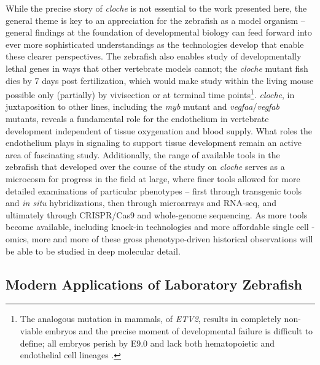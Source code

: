 While the precise story of \textit{cloche} is not essential to the work presented here, the general theme is key to an appreciation for the zebrafish as a model organism -- general findings at the foundation of developmental biology can feed forward into ever more sophisticated understandings as the technologies develop that enable these clearer perspectives. The zebrafish also enables study of developmentally lethal genes in ways that other vertebrate models cannot; the \textit{cloche} mutant fish dies by 7 days post fertilization, which would make study within the living mouse possible only (partially) by vivisection or at terminal time points\footnote{The analogous mutation in mammals, of \textit{ETV2}, results in completely non\hyp{}viable embryos and the precise moment of developmental failure is difficult to define; all embryos perish by E9.0 and lack both hematopoietic and endothelial cell lineages \citep{Garry2016}.}. \textit{cloche}, in juxtaposition to other lines, including the \textit{myb} mutant and \textit{vegfaa}/\textit{vegfab} mutants, reveals a fundamental role for the endothelium in vertebrate development independent of tissue oxygenation and blood supply. What roles the endothelium plays in signaling to support tissue development remain an active area of fascinating study. Additionally, the range of available tools in the zebrafish that developed over the course of the study on \textit{cloche} serves as a microcosm for progress in the field at large, where finer tools allowed for more detailed examinations of particular phenotypes -- first through transgenic tools and \textit{in situ} hybridizations, then through microarrays and RNA\hyp{}seq, and ultimately through CRISPR/Cas9 and whole\hyp{}genome sequencing. As more tools become available, including knock\hyp{}in technologies and more affordable single cell \hyp{}omics, more and more of these gross phenotype\hyp{}driven historical observations will be able to be studied in deep molecular detail. 

\subsection{Modern Applications of Laboratory Zebrafish}\label{modernzf}

